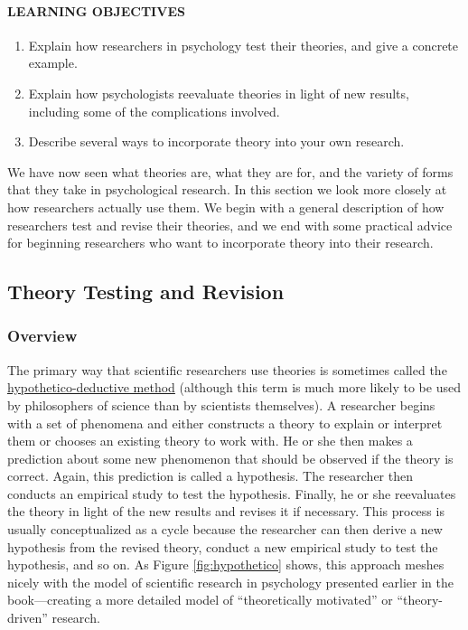 \documentclass[
]{krantz}
\providecommand{\tightlist}{%
  \setlength{\itemsep}{0pt}\setlength{\parskip}{0pt}}
\begin{document}
\hypertarget{learning-objectives-8}{%
\paragraph*{LEARNING OBJECTIVES}\label{learning-objectives-8}}

\begin{enumerate}
\def\labelenumi{\arabic{enumi}.}
\tightlist
\item
  Explain how researchers in psychology test their theories, and give a concrete example.
\item
  Explain how psychologists reevaluate theories in light of new results, including some of the complications involved.
\item
  Describe several ways to incorporate theory into your own research.
\end{enumerate}

We have now seen what theories are, what they are for, and the variety of forms that they take in psychological research. In this section we look more closely at how researchers actually use them. We begin with a general description of how researchers test and revise their theories, and we end with some practical advice for beginning researchers who want to incorporate theory into their research.

\hypertarget{theory-testing-and-revision}{%
\subsection*{Theory Testing and Revision}\label{theory-testing-and-revision}}


\hypertarget{overview}{%
\subsubsection*{Overview}\label{overview}}


The primary way that scientific researchers use theories is sometimes called the \protect\hyperlink{hypothetico-deductive-method}{hypothetico-deductive method} (although this term is much more likely to be used by philosophers of science than by scientists themselves). A researcher begins with a set of phenomena and either constructs a theory to explain or interpret them or chooses an existing theory to work with. He or she then makes a prediction about some new phenomenon that should be observed if the theory is correct. Again, this prediction is called a hypothesis. The researcher then conducts an empirical study to test the hypothesis. Finally, he or she reevaluates the theory in light of the new results and revises it if necessary. This process is usually conceptualized as a cycle because the researcher can then derive a new hypothesis from the revised theory, conduct a new empirical study to test the hypothesis, and so on. As Figure \ref{fig:hypothetico} shows, this approach meshes nicely with the model of scientific research in psychology presented earlier in the book---creating a more detailed model of ``theoretically motivated'' or ``theory-driven'' research.
\end{document}
